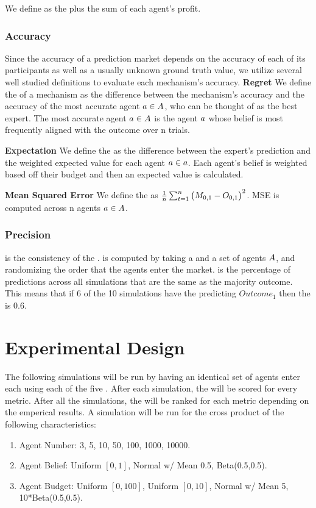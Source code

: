 We define  as the  plus the sum of each agent's profit.

\subsubsection{Accuracy}
Since the accuracy of a prediction market depends on the accuracy of each of its participants
as well as a usually unknown ground truth value, we utilize several well studied definitions
to evaluate each mechanism's accuracy.
\textbf{Regret}
We define the  of a mechanism as the difference between the mechanism's accuracy
and the accuracy of the most accurate agent $a\in A$, who can be thought of as the
best expert. The most accurate agent $a\in A$ is the agent $a$ whose belief is
most frequently aligned with the outcome over n trials.

\textbf{Expectation}
We define the  as the difference between the expert's prediction
and the weighted expected value for each agent $a\in a$. Each agent's belief is weighted
based off their budget and then an expected value is calculated.

\textbf{Mean Squared Error}
We define the  as $\frac{1}{n}\sum_{t=1}^{n} \big(M_{0,1} - O_{0,1}\big)^2$. MSE
is computed across n agents $a\in A$. 

\subsubsection{Precision}
 is the consistency of the .  is computed by taking a 
and a set of agents $A$, and randomizing the order that the agents enter the market.  is the
percentage of predictions across all simulations that are the same as the majority outcome. This means that if 6 of
the 10 simulations have the  predicting $Outcome_{1}$ then the  is 0.6.

\section{Experimental Design}
The following simulations will be run by having an identical set of agents enter each  using each
of the five . After each simulation, the  will be scored for every
metric. After all the simulations, the  will be ranked for each metric depending on the emperical
results. A simulation will be run for the cross product of the following characteristics:
\begin{enumerate}
  \item Agent Number: 3, 5, 10, 50, 100, 1000, 10000.
  \item Agent Belief: Uniform $[0,1]$, Normal w/ Mean 0.5, Beta(0.5,0.5).
  \item Agent Budget: Uniform $[0,100]$, Uniform $[0,10]$, Normal w/ Mean 5, 10*Beta(0.5,0.5).
\end{enumerate}
